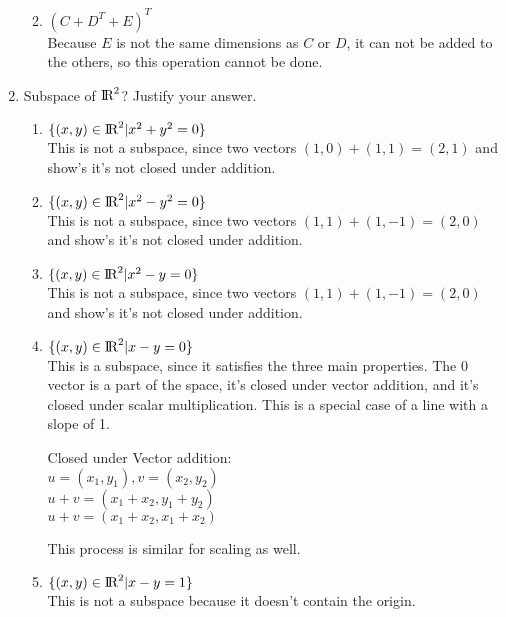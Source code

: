 \documentclass{article}
\newcommand{\IR}{{\rm\hbox{I\kern-.15em R}}}
\begin{document}
\begin{enumerate}
\begin{enumerate}
\begin{center}
                \end{center}
            \item $(C+ D^T + E)^T$\\
                Because $E$ is not the same dimensions as $C$ or $D$, it can not be added to the others, so this operation cannot be done.
        \end{enumerate}
        \item Subspace of $\IR^2$? Justify your answer. 
            \begin{enumerate}
                \item $\{(x,y ) \in \IR^2 | x^2 + y^2 = 0 \}$\\
                    This is not a subspace, since two vectors $(1,0) + (1,1) = (2,1)$ and show's it's not closed under addition. 
                \item $\{(x,y ) \in \IR^2 | x^2 - y^2 = 0 \}$\\
                    This is not a subspace, since two vectors $(1,1) + (1,-1) = (2,0)$ and show's it's not closed under addition. 
                \item $\{(x,y ) \in \IR^2 | x^2 - y = 0 \}$\\
                    This is not a subspace, since two vectors $(1,1) + (1,-1) = (2,0)$ and show's it's not closed under addition. 
                \item $\{(x,y ) \in \IR^2 | x - y = 0 \}$\\
                    This is a subspace, since it satisfies the three main properties. The $0$ vector is a part of the space,
                    it's closed under vector addition, and it's closed under scalar multiplication. This is a special case of a
                    line with a slope of 1.
                    \begin{center}
                        Closed under Vector addition:\\
                        $u = (x_1, y_1), v = (x_2, y_2)$\\
                        $u + v = (x_1+x_2, y_1+y_2)$\\
                        $u + v = (x_1+x_2, x_1+x_2)$\\
                    \end{center}
                    This process is similar for scaling as well.
                \item $\{(x,y ) \in \IR^2 | x - y = 1 \}$\\
                    This is not a subspace because it doesn't contain the origin.

\end{enumerate}
\end{enumerate}
\end{document}
